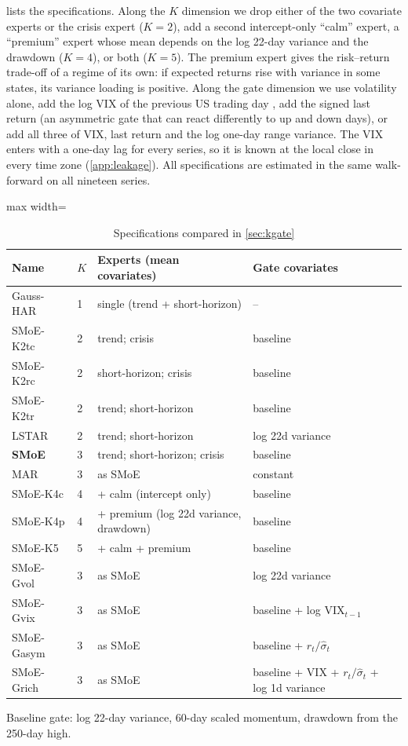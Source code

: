  lists the specifications. Along the $K$ dimension we drop either of the two
covariate experts or the crisis expert ($K=2$), add a second intercept-only ``calm'' expert, a
``premium'' expert whose mean depends on the log 22-day variance and the drawdown ($K=4$), or both
($K=5$). The premium expert gives the risk--return trade-off of \citet{french1987expected} a regime of
its own: if expected returns rise with variance in some states, its variance loading is positive.
Along the gate dimension we use volatility alone, add the log VIX of the previous US trading day
\citep{whaley2000investor,bekaert2014vix}, add the signed last return (an asymmetric gate that can
react differently to up and down days), or add all three of VIX, last return and the log one-day
range variance. The VIX enters with a one-day lag for every series, so it is known at the local
close in every time zone (\cref{app:leakage}). All specifications are estimated in the same
walk-forward on all nineteen series.

\begin{table}[t]\centering\small
\caption{Specifications compared in \cref{sec:kgate}}\label{tab:kg-design}
\begin{adjustbox}{max width=\textwidth}\begin{tabular}{llll}\toprule
Name & $K$ & Experts (mean covariates) & Gate covariates\\\midrule
Gauss-HAR & 1 & single (trend + short-horizon) & --\\
SMoE-K2tc & 2 & trend; crisis & baseline\\
SMoE-K2rc & 2 & short-horizon; crisis & baseline\\
SMoE-K2tr & 2 & trend; short-horizon & baseline\\
LSTAR & 2 & trend; short-horizon & log 22d variance\\
\textbf{SMoE} & 3 & trend; short-horizon; crisis & baseline\\
MAR & 3 & as SMoE & constant\\
SMoE-K4c & 4 & + calm (intercept only) & baseline\\
SMoE-K4p & 4 & + premium (log 22d variance, drawdown) & baseline\\
SMoE-K5 & 5 & + calm + premium & baseline\\
SMoE-Gvol & 3 & as SMoE & log 22d variance\\
SMoE-Gvix & 3 & as SMoE & baseline + log VIX$_{t-1}$\\
SMoE-Gasym & 3 & as SMoE & baseline + $r_t/\hat\sigma_t$\\
SMoE-Grich & 3 & as SMoE & baseline + VIX + $r_t/\hat\sigma_t$ + log 1d variance\\
\bottomrule\end{tabular}\end{adjustbox}
\par\smallskip\footnotesize Baseline gate: log 22-day variance, 60-day scaled momentum, drawdown
from the 250-day high.
\end{table}

